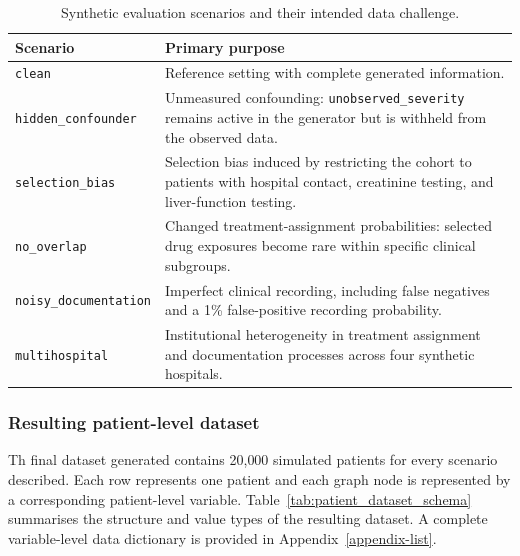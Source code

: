 \begin{table}[htbp]
    \centering
    \small
    \caption{Synthetic evaluation scenarios and their intended data challenge.}
    \label{tab:synthetic_scenarios}
    \begin{tabularx}{\textwidth}{@{}l X@{}}
        \toprule
        \textbf{Scenario} & \textbf{Primary purpose} \\
        \midrule
        \texttt{clean} &
        Reference setting with complete generated information. \\
        \addlinespace

        \texttt{hidden\_confounder} &
        Unmeasured confounding: \texttt{unobserved\_severity} remains active
        in the generator but is withheld from the observed data. \\
        \addlinespace

        \texttt{selection\_bias} &
        Selection bias induced by restricting the cohort to patients with
        hospital contact, creatinine testing, and liver-function testing. \\
        \addlinespace

        \texttt{no\_overlap} &
        Changed treatment-assignment probabilities: selected drug exposures become rare
        within specific clinical subgroups. \\
        \addlinespace

        \texttt{noisy\_documentation} &
        Imperfect clinical recording, including false negatives and a 1\%
        false-positive recording probability. \\
        \addlinespace

        \texttt{multihospital} &
        Institutional heterogeneity in treatment assignment and documentation
        processes across four synthetic hospitals. \\
        \bottomrule
    \end{tabularx}
\end{table}

\subsubsection{Resulting patient-level dataset}

Th final dataset generated
contains 20{,}000 simulated patients for every scenario described. Each row represents one patient and
each graph node is represented by a corresponding patient-level variable.
Table~\ref{tab:patient_dataset_schema} summarises the structure and value
types of the resulting dataset. A complete variable-level data dictionary is
provided in Appendix~\ref{appendix-list}.

